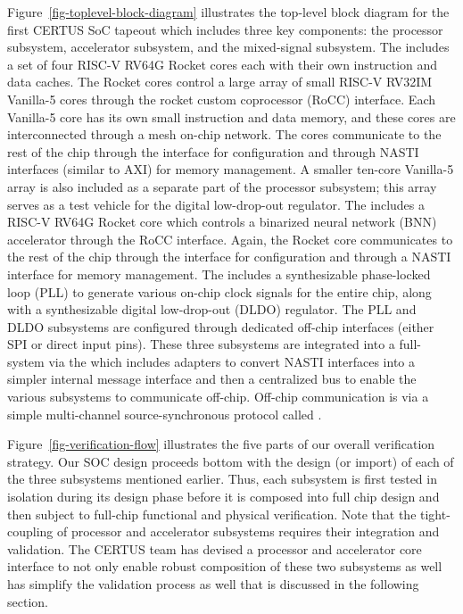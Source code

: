 Figure~\ref{fig-toplevel-block-diagram} illustrates the top-level block
diagram for the first CERTUS SoC tapeout which includes three key
components: the processor subsystem, accelerator subsystem, and the
mixed-signal subsystem. The  includes a set of
four RISC-V RV64G Rocket cores each with their own instruction and data
caches. The Rocket cores control a large array of small RISC-V RV32IM
Vanilla-5 cores through the rocket custom coprocessor (RoCC) interface.
Each Vanilla-5 core has its own small instruction and data memory, and
these cores are interconnected through a mesh on-chip network. The cores
communicate to the rest of the chip through the  interface
for configuration and through NASTI interfaces (similar to AXI) for
memory management. A smaller ten-core Vanilla-5 array is also included as
a separate part of the processor subsystem; this array serves as a test
vehicle for the digital low-drop-out regulator. The  includes a RISC-V RV64G Rocket core which controls a
binarized neural network (BNN) accelerator through the RoCC interface.
Again, the Rocket core communicates to the rest of the chip through the
 interface for configuration and through a NASTI interface
for memory management. The  includes a
synthesizable phase-locked loop (PLL) to generate various on-chip clock
signals for the entire chip, along with a synthesizable digital
low-drop-out (DLDO) regulator. The PLL and DLDO subsystems are configured
through dedicated off-chip interfaces (either SPI or direct input pins).
These three subsystems are integrated into a full-system via the
 which includes adapters to convert NASTI interfaces
into a simpler internal message interface and then a centralized bus to
enable the various subsystems to communicate off-chip. Off-chip
communication is via a simple multi-channel source-synchronous protocol
called .



Figure~\ref{fig-verification-flow} illustrates the five parts 
of our overall verification strategy. Our SOC design proceeds bottom with the design (or import) of each of the three subsystems mentioned earlier. Thus, each subsystem is first tested in isolation during its design phase before it is composed into full chip design and then subject to full-chip functional and physical verification. Note that the tight-coupling of processor and accelerator subsystems requires their integration and validation. The CERTUS team has devised a processor and accelerator core interface to not only enable robust composition of these two subsystems as well has simplify the validation process as well that is discussed in the following section.

